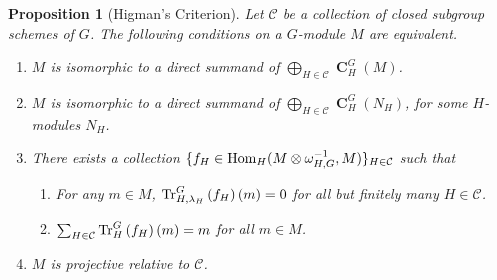\documentclass[12pt]{amsart}
\newtheorem{proposition}[theorem]{Proposition}
\theoremstyle{definition}
\DeclareMathOperator{\coind}{\mathbf{C}}
\begin{document}
\begin{proposition}[Higman's Criterion]\label{prop:Higman}
Let $\mathcal{C}$ be a collection of closed subgroup schemes of $G$. The following conditions on a $G$-module $M$ are equivalent.
\begin{enumerate}
\item $M$ is isomorphic to a direct summand of $\bigoplus_{H\in \mathcal{C}}\coind_H^G (M)$.
\item $M$ is isomorphic to a direct summand of $\bigoplus_{H\in \mathcal{C}}\coind_H^G(N_H)$, for some $H$-modules $N_H$.
\item There exists a collection $\{f_H\in {\rm Hom}_H(M\otimes\omega_{H,G}^{-1},M)\}_{H\in\mathcal{C}}$ such that
\begin{enumerate}
\item  For any $m\in M$, ${\rm Tr}_{H,\lambda_H}^G\left(f_H\right)(m)= 0$ for all but finitely many $H\in\mathcal{C}$.
\item $\sum_{H\in\mathcal{C}}{\rm Tr}_{H}^G\left(f_H\right)(m)=m$ for all $m\in M$.
\end{enumerate}  
\item $M$ is projective relative to $\mathcal{C}$.
\end{enumerate}
\end{proposition}
\end{document}
